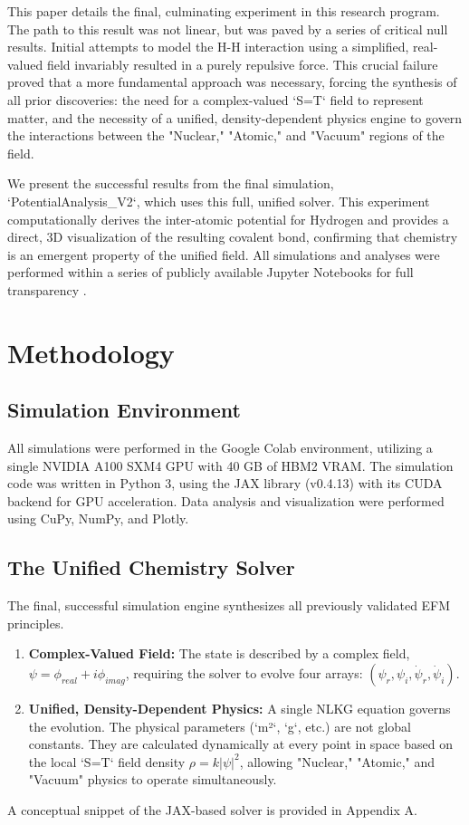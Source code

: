 \documentclass[11pt]{article}
\begin{document}
This paper details the final, culminating experiment in this research program. The path to this result was not linear, but was paved by a series of critical null results. Initial attempts to model the H-H interaction using a simplified, real-valued field invariably resulted in a purely repulsive force. This crucial failure proved that a more fundamental approach was necessary, forcing the synthesis of all prior discoveries: the need for a complex-valued `S=T` field to represent matter, and the necessity of a unified, density-dependent physics engine to govern the interactions between the "Nuclear," "Atomic," and "Vacuum" regions of the field.

We present the successful results from the final simulation, `PotentialAnalysis_V2`, which uses this full, unified solver. This experiment computationally derives the inter-atomic potential for Hydrogen and provides a direct, 3D visualization of the resulting covalent bond, confirming that chemistry is an emergent property of the unified field. All simulations and analyses were performed within a series of publicly available Jupyter Notebooks for full transparency \citep{atomsform_notebook_definitive}.

\section{Methodology}
\subsection{Simulation Environment}
All simulations were performed in the Google Colab environment, utilizing a single NVIDIA A100 SXM4 GPU with 40 GB of HBM2 VRAM. The simulation code was written in Python 3, using the JAX library (v0.4.13) with its CUDA backend for GPU acceleration. Data analysis and visualization were performed using CuPy, NumPy, and Plotly.

\subsection{The Unified Chemistry Solver}
The final, successful simulation engine synthesizes all previously validated EFM principles.
\begin{enumerate}
    \item \textbf{Complex-Valued Field:} The state is described by a complex field, \(\psi = \phi_{real} + i\phi_{imag}\), requiring the solver to evolve four arrays: \((\psi_r, \psi_i, \dot{\psi}_r, \dot{\psi}_i)\).
    \item \textbf{Unified, Density-Dependent Physics:} A single NLKG equation governs the evolution. The physical parameters (`m²`, `g`, etc.) are not global constants. They are calculated dynamically at every point in space based on the local `S=T` field density \(\rho = k|\psi|^2\), allowing "Nuclear," "Atomic," and "Vacuum" physics to operate simultaneously.
\end{enumerate}
A conceptual snippet of the JAX-based solver is provided in Appendix A.
\end{document}
